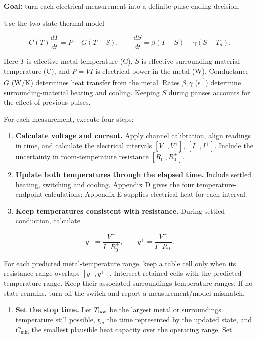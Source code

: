 \documentclass[11pt,letterpaper]{article}
\begin{document}
\textbf{Goal:} turn each electrical measurement into a definite pulse-ending decision.

Use the two-state thermal model

\[
C(T)\frac{dT}{dt}=P-G(T-S),\qquad
\frac{dS}{dt}=\beta(T-S)-\gamma(S-T_a).
\]

Here \(T\) is effective metal temperature (\textdegree{}C), \(S\) is effective surrounding-material temperature (\textdegree{}C), and \(P=VI\) is electrical power in the metal (W). Conductance \(G\) (W/K) determines heat transfer from the metal. Rates \(\beta,\gamma\) (s\textsuperscript{-1}) determine surrounding-material heating and cooling. Keeping \(S\) during pauses accounts for the effect of previous pulses.

For each measurement, execute four steps:

\begin{enumerate}[start=1]
\item \textbf{Calculate voltage and current.} Apply channel calibration, align readings in time, and calculate the electrical intervals \([V^-,V^+]\), \([I^-,I^+]\). Include the uncertainty in room-temperature resistance \([R_0^-,R_0^+]\).
\item \textbf{Update both temperatures through the elapsed time.} Include settled heating, switching and cooling. Appendix D gives the four temperature-endpoint calculations; Appendix E supplies electrical heat for each interval.
\item \textbf{Keep temperatures consistent with resistance.} During settled conduction, calculate
\end{enumerate}

\[
y^-=\frac{V^-}{I^+R_0^+},\qquad
y^+=\frac{V^+}{I^-R_0^-}.
\]

For each predicted metal-temperature range, keep a table cell only when its resistance range overlaps \([y^-,y^+]\). Intersect retained cells with the predicted temperature range. Keep their associated surroundings-temperature ranges. If no state remains, turn off the switch and report a measurement/model mismatch.

\begin{enumerate}[start=4]
\item \textbf{Set the stop time.} Let \(T_{\rm hot}\) be the largest metal or surroundings temperature still possible, \(t_m\) the time represented by the updated state, and \(C_{\min}\) the smallest plausible heat capacity over the operating range. Set
\end{enumerate}
\end{document}
